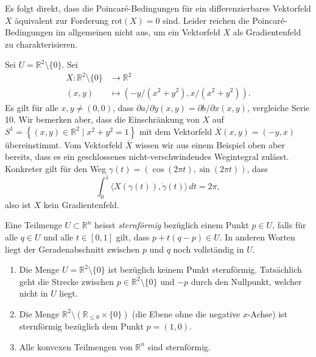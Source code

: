 \documentclass[../main.tex]{subfiles}
\begin{document}
Es folgt direkt, dass die Poincaré-Bedingungen für
ein differenzierbares Vektorfeld $X$ äquivalent
zur Forderung $\text{rot}(X) = 0$ sind.
Leider reichen die Poincaré-Bedingungen im allgemeinen
nicht aus, um ein Vektorfeld $X$ als Gradientenfeld
zu charakterisieren.

\begin{example}
  Sei $U = \mathbb{R}^2 \setminus \{0\}$.
  Sei  
  \begin{align*}
    X \colon \mathbb{R}^2 \setminus \{0\} & \to \mathbb{R}^2 \\
    (x, y) & \mapsto (-y/(x^2 + y^2), x/(x^2 + y^2)).
  \end{align*}
  Es gilt für alle $x, y \neq (0, 0)$, dass
  $\partial a / \partial y (x, y) = \partial b/ \partial x(x, y)$,
  vergleiche Serie 10.
  Wir bemerken aber, dass die Einschränkung von $X$ 
  auf $S^1 = \left\{(x, y) \in \mathbb{R}^2 \mid x^2 + y^2 = 1\right\}$ 
  mit dem Vektorfeld $\overline X(x, y) = (-y, x)$ übereinstimmt.
  Vom Vektorfeld $\overline X$ wissen wir aus einem Beispiel
  oben aber bereits, dass es ein geschlossenes nicht-verschwindendes
  Wegintegral zulässt.
  Konkreter gilt für den Weg
  $\gamma(t) = (\cos(2 \pi t), \sin (2 \pi t))$, dass
  \[
    \int_{0}^{1} \langle X(\gamma(t)), \dot \gamma(t) \rangle \, dt
    = 2\pi,
  \]
  also ist $X$ kein Gradientenfeld.
\end{example}

\begin{definition}
  Eine Teilmenge $U \subset \mathbb{R}^n$ 
  heisst \emph{sternförmig} bezüglich einem Punkt $p \in U$,
  falls für alle $q \in U$ und alle $t \in [0, 1]$ 
  gilt, dass $p + t(q - p) \in U$.
  In anderen Worten liegt der Geradenabschnitt zwischen $p$ und $q$ 
  noch vollständig in $U$.
\end{definition}

\begin{examples}
  \leavevmode
  \begin{enumerate}[(1)]
    \item Die Menge $U = \mathbb{R}^2 \setminus \{0 \}$ ist bezüglich
      keinem Punkt sternförmig.
      Tatsächlich geht die Strecke zwischen 
      $p \in \mathbb{R}^2 \setminus \{0\}$
      und $-p$ durch den Nullpunkt, welcher nicht in $U$ liegt.
    \item Die Menge $\mathbb{R}^2 \setminus (\mathbb{R}_{\leq 0}
      \times \{0\})$ (die Ebene ohne die negative $x$-Achse) 
      ist sternförmig bezüglich dem Punkt 
      $p = (1, 0)$.
    \item Alle konvexen Teilmengen von $\mathbb{R}^n$ sind sternförmig.
  \end{enumerate}
\end{examples}
\end{document}
